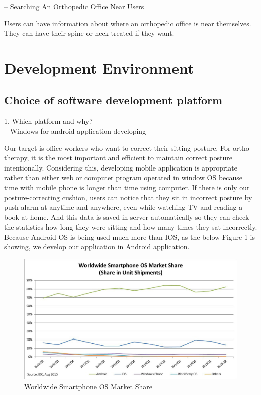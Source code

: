 \documentclass[conference]{IEEEtran}
\begin{document}
-- Searching An Orthopedic Office Near Users

Users can have information about where an orthopedic office is near themselves. They can have their spine or neck treated if they want.

\section{Development Environment}

\subsection{Choice of software development platform}

1. Which platform and why?  \\

-- Windows for android application developing

Our target is office workers who want to correct their sitting posture. For ortho-therapy, it is the most important and efficient to maintain correct posture intentionally. Considering this, developing mobile application is appropriate rather than either web or computer program operated in window OS because time with mobile phone is longer than time using computer. If there is only our posture-correcting cushion, users can notice that they sit in incorrect posture by push alarm at anytime and anywhere, even while watching TV and reading a book at home. And this data is saved in server automatically so they can check the statistics how long they were sitting and how many times they sat incorrectly. Because Android OS is being used much more than IOS, as the below Figure 1 is showing, we develop our application in Android application.

\begin{figure}[htbp]
\begin{center}
    \includegraphics[scale=0.4]{img_03.png}
    \caption{Worldwide Smartphone OS Market Share} 
\end{center}
\end{figure}
\end{document}
